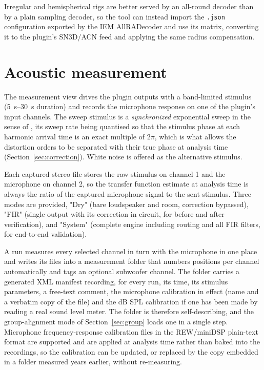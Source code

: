 \documentclass[10pt,a4paper]{article}
\begin{document}
Irregular and hemispherical rigs are better served by an all-round decoder than by a plain sampling decoder, so the tool can instead import the \texttt{.json} configuration exported by the IEM AllRADecoder and use its matrix, converting it to the plugin's SN3D/ACN feed and applying the same radius compensation.

\section{Acoustic measurement}\label{sec:measurement}

The measurement view drives the plugin outputs with a band-limited stimulus (\SIrange{5}{30}{\second} duration) and records the microphone response on one of the plugin's input channels. The sweep stimulus is a \emph{synchronized} exponential sweep in the sense of \cite{Novak2015}, its sweep rate being quantised so that the stimulus phase at each harmonic arrival time is an exact multiple of $2\pi$, which is what allows the distortion orders to be separated with their true phase at analysis time (Section~\ref{sec:correction}). White noise is offered as the alternative stimulus.

Each captured stereo file stores the raw stimulus on channel 1 and the microphone on channel 2, so the transfer function estimate at analysis time is always the ratio of the captured microphone signal to the sent stimulus. Three modes are provided, "Dry" (bare loudspeaker and room, correction bypassed), "FIR" (single output with its correction in circuit, for before and after verification), and "System" (complete engine including routing and all FIR filters, for end-to-end validation).

A run measures every selected channel in turn with the microphone in one place and writes its files into a measurement folder that numbers positions per channel automatically and tags an optional subwoofer channel. The folder carries a generated XML manifest recording, for every run, its time, its stimulus parameters, a free-text comment, the microphone calibration in effect (name and a verbatim copy of the file) and the dB SPL calibration if one has been made by reading a real sound level meter. The folder is therefore self-describing, and the group-alignment mode of Section~\ref{sec:group} loads one in a single step. Microphone frequency-response calibration files in the REW/miniDSP plain-text format are supported and are applied at analysis time rather than baked into the recordings, so the calibration can be updated, or replaced by the copy embedded in a folder measured years earlier, without re-measuring.
\end{document}

